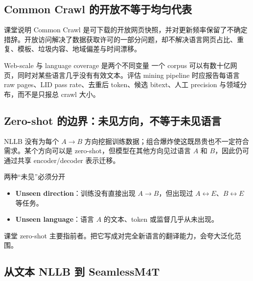 
\subsection{Common Crawl 的开放不等于均匀代表}

课堂说明 Common Crawl 是可下载的开放网页快照，并对更新频率保留了不确定措辞。开放访问解决了数据获取许可的一部分问题，却不解决语言网页占比、重复、模板、垃圾内容、地域偏差与时间漂移。

\begin{warningbox}{Web-scale 与 language coverage 是两个不同变量}
一个 corpus 可以有数十亿网页，同时对某些语言几乎没有有效文本。评估 mining pipeline 时应报告每语言 raw pages、LID pass rate、去重后 token、候选 bitext、人工 precision 与领域分布，而不是只报总 crawl 大小。
\end{warningbox}

\subsection{Zero-shot 的边界：未见方向，不等于未见语言}

NLLB 没有为每个 $A\rightarrow B$ 方向挖掘训练数据；组合爆炸使这既昂贵也不一定符合需求。某个方向可以是 zero-shot，但模型在其他方向见过语言 $A$ 和 $B$，因此仍可通过共享 encoder/decoder 表示迁移。

\begin{importantbox}{两种“未见”必须分开}
\begin{itemize}
  \item \textbf{Unseen direction}：训练没有直接出现 $A\rightarrow B$，但出现过 $A\leftrightarrow E$、$B\leftrightarrow E$ 等任务。
  \item \textbf{Unseen language}：语言 $A$ 的文本、token 或监督几乎从未出现。
\end{itemize}
课堂 zero-shot 主要指前者。把它写成对完全新语言的翻译能力，会夸大泛化范围。
\end{importantbox}


\subsection{从文本 NLLB 到 SeamlessM4T}

